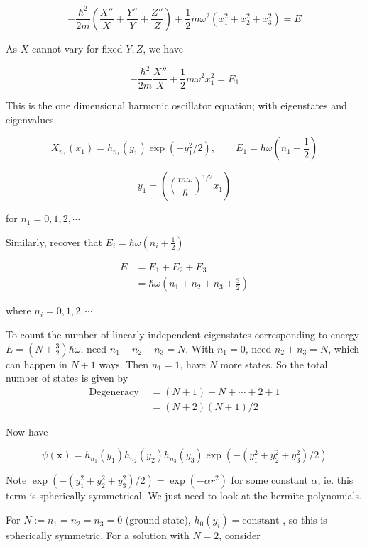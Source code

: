 \documentclass[a4paper]{article}
\begin{document}
\[  - \frac{\hbar^{2}}{2m} \left(  \frac{X''}{X} +  \frac{Y''}{Y} +  \frac{Z''}{Z} \right)  + \frac{1}{2} m \omega^{2} (x_{1}^{2} + x_{2}^{2} + x_{3}^{2}) = E  \]


As $ X $ cannot vary for fixed $ Y,Z $, we have

\[ - \frac{\hbar^{2}}{2m} \frac{X''}{X}  + \frac{1}{2} m \omega^{2} x_{1}^{2}  = E_{1} \]

This is the one dimensional harmonic oscillator equation; with eigenstates and eigenvalues

\[ X_{n_{1}}(x_{1}) = h_{n_{1}}(y_{1})   \exp \left(   - y_{1}^{2}/2 \right), \qquad E_{1} = \hbar \omega (n_{1} + \frac{1}{2})    \]

\[ y_{1} = \left( \left(  \frac{m \omega}{\hbar}  \right)^{1/2} x_{1} \right) \]

for $ n_{1} = 0,1,2,\cdots $

Similarly, recover that $ E_{i} = \hbar \omega (n_{i} + \frac{1}{2}) $

\begin{align*}
 E &= E_{1} + E_{2} + E_{3} \\
& = \hbar \omega \left(     n_{1} + n_{2} + n_{3} + \frac{3}{2} \right)
\end{align*}

where $ n_{i} = 0,1,2,\cdots $


To count the number of linearly independent eigenstates corresponding to energy $ E = (N + \frac{3}{2} ) \hbar \omega $, need $ n_{1} + n_{2} + n_{3} = N $. With $ n_{1} = 0 $, need $ n_{2} + n_{3} = N $, which can happen in $ N + 1 $ ways. Then $ n_{1} = 1 $, have $ N $ more states. So the total number of states is given by
\begin{align*}
\text{Degeneracy }& = (N + 1) + N + \cdots + 2 + 1  \\
& = (N + 2)(N + 1)/2
\end{align*}

Now have

\[ \psi(\mathbf{x}) = h_{n_{1}}(y_{1})h_{n_{2}}(y_{2})h_{n_{3}}(y_{3})  \exp \left(  -(y_{1}^{2} + y_{2}^{2} + y_{3}^{2})/2 \right) \]


Note $  \exp \left(  -(y_{1}^{2} + y_{2}^{2} + y_{3}^{2})/2 \right) = \exp(- \alpha r^{2}) $ for some constant $ \alpha $, ie. this term is spherically symmetrical. We just need to look at the hermite polynomials.


For $ N := n_{1} = n_{2} = n_{3} = 0 $ (ground state), $ h_{0}(y_{i}) = \text{constant } $, so this is spherically symmetric. For a solution with $ N = 2 $, consider
\end{document}
